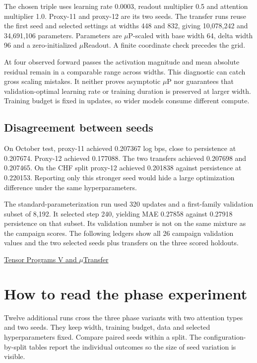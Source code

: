 \documentclass[11pt,oneside,openany]{book}
\begin{document}
The chosen triple uses learning rate 0.0003, readout multiplier 0.5 and attention multiplier 1.0. Proxy-11 and proxy-12 are its two seeds. The transfer runs reuse the first seed and selected settings at widths 448 and 832, giving 10,078,242 and 34,691,106 parameters. Parameters are \ensuremath{\mu}P-scaled with base width 64, delta width 96 and a zero-initialized \ensuremath{\mu}Readout. A finite coordinate check precedes the grid.

At four observed forward passes the activation magnitude and mean absolute residual remain in a comparable range across widths. This diagnostic can catch gross scaling mistakes. It neither proves asymptotic \ensuremath{\mu}P nor guarantees that validation-optimal learning rate or training duration is preserved at larger width. Training budget is fixed in updates, so wider models consume different compute.

\section*{Disagreement between seeds}
On October test, proxy-11 achieved 0.207367 log bps, close to persistence at 0.207674. Proxy-12 achieved 0.177088. The two transfers achieved 0.207698 and 0.207465. On the CHF split proxy-12 achieved 0.201838 against persistence at 0.220153. Reporting only this stronger seed would hide a large optimization difference under the same hyperparameters.

The standard-parameterization run used 320 updates and a first-family validation subset of 8,192. It selected step 240, yielding MAE 0.27858 against 0.27918 persistence on that subset. Its validation number is not on the same mixture as the campaign scores. The following ledgers show all 26 campaign validation values and the two selected seeds plus transfers on the three scored holdouts.

{\small\sffamily\href{https://arxiv.org/abs/2203.03466}{Tensor Programs V and \ensuremath{\mu}Transfer}\par}
\chapter{How to read the phase experiment}
Twelve additional runs cross the three phase variants with two attention types and two seeds. They keep width, training budget, data and selected hyperparameters fixed. Compare paired seeds within a split. The configuration-by-split tables report the individual outcomes so the size of seed variation is visible.
\end{document}
